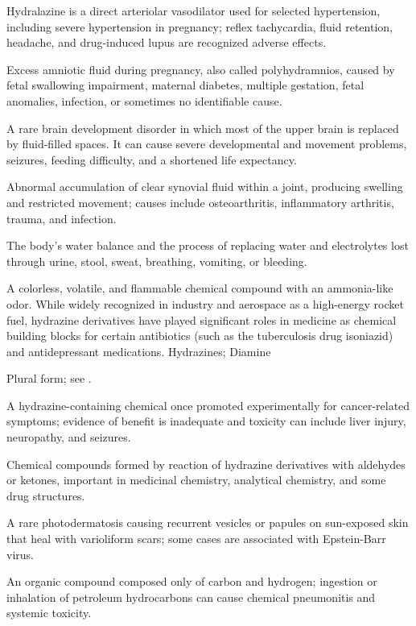  Hydralazine is a direct arteriolar vasodilator used for selected hypertension, including severe hypertension in pregnancy; reflex tachycardia, fluid retention, headache, and drug-induced lupus are recognized adverse effects.

 Excess amniotic fluid during pregnancy, also called polyhydramnios, caused by fetal swallowing impairment, maternal diabetes, multiple gestation, fetal anomalies, infection, or sometimes no identifiable cause.

 A rare brain development disorder in which most of the upper brain is replaced by fluid-filled spaces. It can cause severe developmental and movement problems, seizures, feeding difficulty, and a shortened life expectancy.

 Abnormal accumulation of clear synovial fluid within a joint, producing swelling and restricted movement; causes include osteoarthritis, inflammatory arthritis, trauma, and infection.

 The body’s water balance and the process of replacing water and electrolytes lost through urine, stool, sweat, breathing, vomiting, or bleeding.

 A colorless, volatile, and flammable chemical compound with an ammonia-like odor. While widely recognized in industry and aerospace as a high-energy rocket fuel, hydrazine derivatives have played significant roles in medicine as chemical building blocks for certain antibiotics (such as the tuberculosis drug isoniazid) and antidepressant medications.
\synonyms
Hydrazines; Diamine

 Plural form; see .

 A hydrazine-containing chemical once promoted experimentally for cancer-related symptoms; evidence of benefit is inadequate and toxicity can include liver injury, neuropathy, and seizures.

 Chemical compounds formed by reaction of hydrazine derivatives with aldehydes or ketones, important in medicinal chemistry, analytical chemistry, and some drug structures.

 A rare photodermatosis causing recurrent vesicles or papules on sun-exposed skin that heal with varioliform scars; some cases are associated with Epstein-Barr virus.

 An organic compound composed only of carbon and hydrogen; ingestion or inhalation of petroleum hydrocarbons can cause chemical pneumonitis and systemic toxicity.

